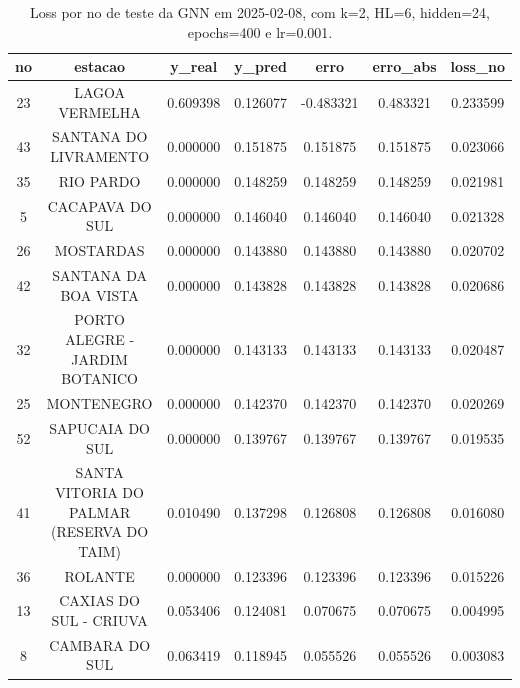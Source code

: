 \begin{table}[h]
\centering
\caption{Loss por no de teste da GNN em 2025-02-08, com k=2, HL=6, hidden=24, epochs=400 e lr=0.001.}
\label{tab:gnn_loss_k2_hl6_h24_e400_d20250208}
\begin{tabular}{ccccccc}
\toprule
no & estacao & y\_real & y\_pred & erro & erro\_abs & loss\_no \\
\midrule
23 & LAGOA VERMELHA & 0.609398 & 0.126077 & -0.483321 & 0.483321 & 0.233599 \\
43 & SANTANA DO LIVRAMENTO & 0.000000 & 0.151875 & 0.151875 & 0.151875 & 0.023066 \\
35 & RIO PARDO & 0.000000 & 0.148259 & 0.148259 & 0.148259 & 0.021981 \\
5 & CACAPAVA DO SUL & 0.000000 & 0.146040 & 0.146040 & 0.146040 & 0.021328 \\
26 & MOSTARDAS & 0.000000 & 0.143880 & 0.143880 & 0.143880 & 0.020702 \\
42 & SANTANA DA BOA VISTA & 0.000000 & 0.143828 & 0.143828 & 0.143828 & 0.020686 \\
32 & PORTO ALEGRE - JARDIM BOTANICO & 0.000000 & 0.143133 & 0.143133 & 0.143133 & 0.020487 \\
25 & MONTENEGRO & 0.000000 & 0.142370 & 0.142370 & 0.142370 & 0.020269 \\
52 & SAPUCAIA DO SUL & 0.000000 & 0.139767 & 0.139767 & 0.139767 & 0.019535 \\
41 & SANTA VITORIA DO PALMAR (RESERVA DO TAIM) & 0.010490 & 0.137298 & 0.126808 & 0.126808 & 0.016080 \\
36 & ROLANTE & 0.000000 & 0.123396 & 0.123396 & 0.123396 & 0.015226 \\
13 & CAXIAS DO SUL - CRIUVA & 0.053406 & 0.124081 & 0.070675 & 0.070675 & 0.004995 \\
8 & CAMBARA DO SUL & 0.063419 & 0.118945 & 0.055526 & 0.055526 & 0.003083 \\
\bottomrule
\end{tabular}
\end{table}
